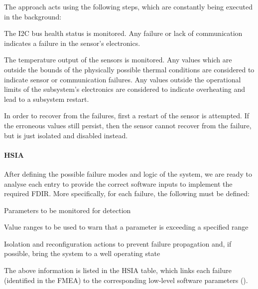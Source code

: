 \documentclass[a4paper,nobib]{tufte-book}
\begin{document}
The approach acts using the following steps, which are constantly being executed in the background:
\begin{compactenum}
	\item The \ac{I2C} bus health status is monitored. Any failure or lack of communication indicates a failure in the sensor's electronics.
	\item The temperature output of the sensors is monitored. Any values which are outside the bounds of the physically possible thermal conditions are considered to indicate sensor or communication failures. Any values outside the operational limits of the subsystem's electronics are considered to indicate overheating and lead to a subsystem restart.
	\item In order to recover from the failures, first a restart of the sensor is attempted. If the erroneous values still persist, then the sensor cannot recover from the failure, but is just isolated and disabled instead.
\end{compactenum}

\clearpage
\paragraph{\acl{HSIA}}

After defining the possible failure modes and logic of the system, we are ready to analyse each entry to provide the correct software inputs to implement the required \ac{FDIR}. More specifically, for each failure, the following must be defined: \autocite[84]{SAVOIR-HB-003}
\begin{compactitem}
	\item Parameters to be monitored for detection
	\item Value ranges to be used to warn that a parameter is exceeding a specified range
	\item Isolation and reconfiguration actions to prevent failure propagation and, if possible, bring the system to a well operating state
\end{compactitem}

The above information is listed in the \acf{HSIA} table, which links each failure (identified in the \acl{FMEA}) to the corresponding low-level software parameters ().
\end{document}
